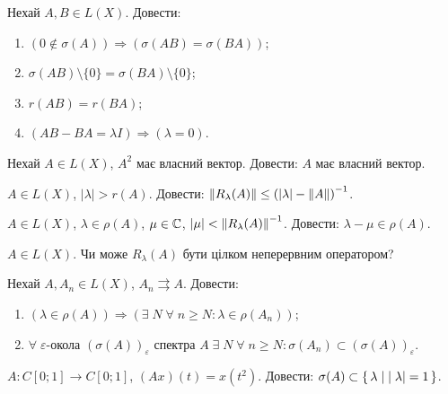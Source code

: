 \begin{exercise}
    Нехай $A, B \in L(X)$. Довести:
    \begin{enumerate}
        \item $\left( 0 \notin \sigma(A)\right) \Rightarrow \left( \sigma(AB) = \sigma(BA)\right)$;
        \item $\sigma(AB) \setminus \{ 0 \} = \sigma(BA) \setminus \{ 0 \}$;
        \item $r(AB) = r(BA)$;
        \item $\left( AB - BA = \lambda I \right) \Rightarrow \left( \lambda = 0\right)$.
    \end{enumerate}
\end{exercise}

\begin{exercise}
    Нехай $A \in L(X)$, $A^2$ має власний вектор. Довести: $A$ має власний вектор.
\end{exercise}

\begin{exercise}
    $A \in L(X)$, $| \lambda | > r(A)$. 
    Довести: $\left\lVert R_\lambda (A)\right\rVert \leq \left( | \lambda | - \left\lVert A\right\rVert\right)^{-1}$.
\end{exercise}

\begin{exercise}\label{N:1_7_25}
    $A \in L(X)$, $\lambda \in \rho (A)$, $\mu \in \mathbb{C}$, $|\mu| < \left\lVert R_\lambda (A)\right\rVert^{-1}$.
    Довести: $\lambda - \mu \in \rho (A)$.
\end{exercise}

\begin{exercise}
    $A \in L(X)$. Чи може $R_\lambda (A)$ бути цілком неперервним оператором?
\end{exercise}

\begin{exercise}
    Нехай $A, A_n \in L(X)$, $A_n \rightrightarrows A$. Довести:
    \begin{enumerate}
        \item $\left( \lambda \in \rho(A) \right) \Rightarrow \left( \exists \; N \; \forall \; n \geq N : \lambda \in \rho(A_n) \right)$;
        \item $\forall \; \varepsilon\text{-окола } (\sigma(A))_\varepsilon \text{ спектра } A \; \exists \; N \; \forall \; n \geq N : \sigma(A_n) \subset (\sigma(A))_\varepsilon $.
    \end{enumerate}
\end{exercise}

\begin{exercise}
    $A : C[0;1] \to C[0;1]$, $(Ax)(t) = x(t^2)$. Довести: $\sigma(A) \subset \set{\lambda \mid |\lambda| = 1}$.
\end{exercise}

